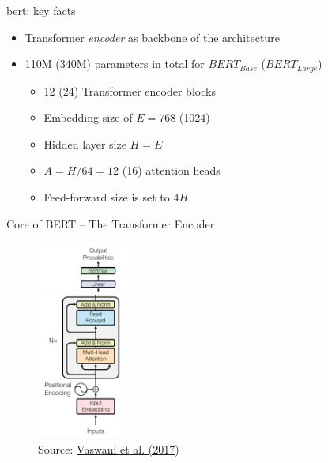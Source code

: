 
\begin{vbframe}{bert: key facts}

\vfill

	\begin{itemize}
		\item Transformer \textit{encoder} as backbone of the architecture
		\item 110M (340M) parameters in total for $BERT_{Base}$ ($BERT_{Large}$)
			\begin{itemize}
				\item 12 (24) Transformer encoder blocks
				\item Embedding size of $E = 768$ (1024)
				\item Hidden layer size $H = E$
				\item $A = H/64 = 12$ (16) attention heads
				\item Feed-forward size is set to $4H$
			\end{itemize}
	\end{itemize}

\vfill

\end{vbframe}


\begin{vbframe}{Core of BERT -- The Transformer Encoder}

\begin{figure}
	\centering
		\includegraphics[width = 3cm]{figure/bert-top.png}\\ 
		\includegraphics[width = 2.8cm]{figure/bert-bottom.png}\\ 
	\footnotesize{Source:} \href{https://arxiv.org/pdf/1706.03762.pdf}{Vaswani et al. (2017)}
\end{figure}

\end{vbframe}

